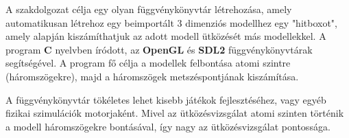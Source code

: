 A szakdolgozat célja egy olyan függvénykönyvtár létrehozása, amely automatikusan létrehoz egy beimportált 3 dimenziós modellhez egy "hitboxot", amely alapján kiszámíthatjuk az adott modell ütközését más modellekkel. A program \textbf{C} nyelvben íródott, az \textbf{OpenGL} és \textbf{SDL2} függvénykönyvtárak segítségével. A program fő célja a modellek felbontása atomi szintre (háromszögekre), majd a háromszögek metszéspontjának kiszámítása.

A függvénykönyvtár tökéletes lehet kisebb játékok fejlesztéséhez, vagy egyéb fizikai szimulációk motorjaként. Mivel az ütközésvizsgálat atomi szinten történik a modell háromszögekre bontásával, így nagy az ütközésvizsgálat pontossága.
